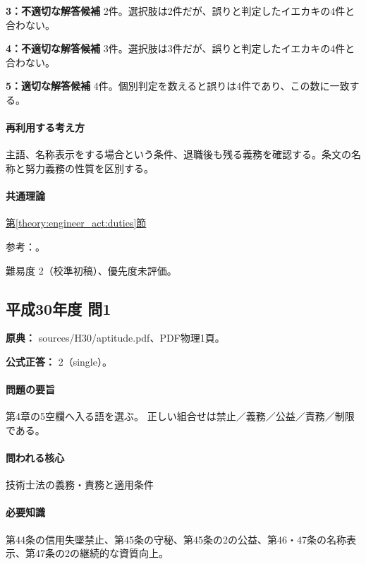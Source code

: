 \noindent\textbf{3：不適切な解答候補} 2件。選択肢は2件だが、誤りと判定したイエカキの4件と合わない。\par

\noindent\textbf{4：不適切な解答候補} 3件。選択肢は3件だが、誤りと判定したイエカキの4件と合わない。\par

\noindent\textbf{5：適切な解答候補} 4件。個別判定を数えると誤りは4件であり、この数に一致する。\par

\paragraph{再利用する考え方} 主語、名称表示をする場合という条件、退職後も残る義務を確認する。条文の名称と努力義務の性質を区別する。

\paragraph{共通理論} \hyperref[theory:engineer_act:duties]{第\ref*{theory:engineer_act:duties}節}

\par 参考：\cite{engineer_act_current}。

\par 難易度 2（校準初稿）、優先度未評価。

\subsection{平成30年度 問1}
\label{q:h30-reg-apt-01}

\noindent\textbf{原典：} sources/H30/aptitude.pdf、PDF物理1頁。

\textbf{公式正答：} 2（single）。

\paragraph{問題の要旨} 第4章の5空欄へ入る語を選ぶ。 正しい組合せは禁止／義務／公益／責務／制限である。

\paragraph{問われる核心} 技術士法の義務・責務と適用条件

\paragraph{必要知識} 第44条の信用失墜禁止、第45条の守秘、第45条の2の公益、第46・47条の名称表示、第47条の2の継続的な資質向上。

